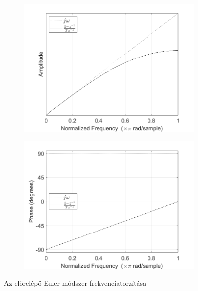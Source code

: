 \begin{figure}[!h]
    \centering
    \begin{subfigure}{0.47\textwidth}
        \centering
        \includegraphics[scale=0.38]{figures/fwEulerA.png}
        \caption{}
    \end{subfigure}
    \hfill
    \begin{subfigure}{0.47\textwidth}
        \centering
        \includegraphics[scale=0.38]{figures/fwEulerP.png}
        \caption{}
    \end{subfigure}
    \caption{Az előrelépő Euler-módszer frekvenciatorzítása}
\end{figure}

